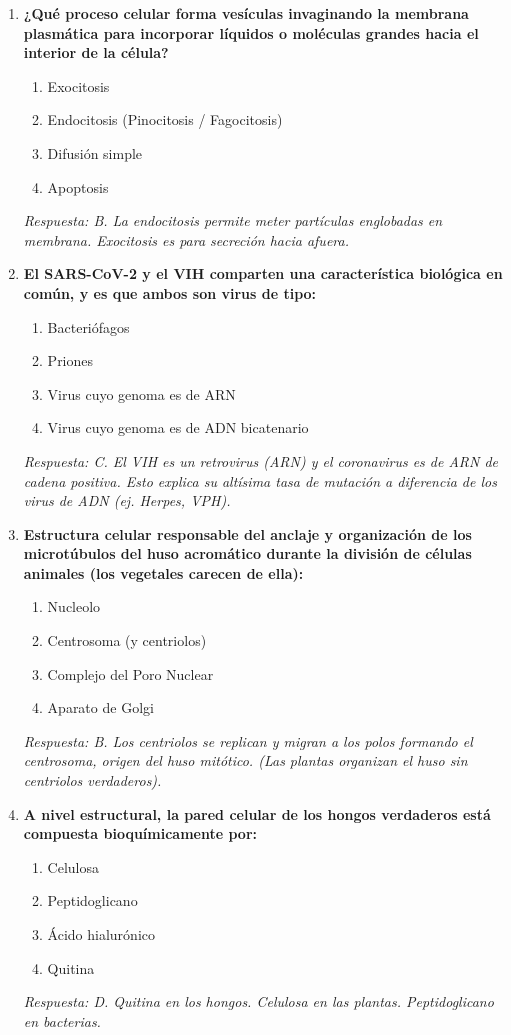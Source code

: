 \documentclass[spanish,letterpaper,oneside]{article}
\begin{document}
\begin{enumerate}[label=\textbf{\arabic*.}]
    \item \textbf{¿Qué proceso celular forma vesículas invaginando la membrana plasmática para incorporar líquidos o moléculas grandes hacia el interior de la célula?}
    \begin{enumerate}
        \item[A)] Exocitosis
        \item[B)] Endocitosis (Pinocitosis / Fagocitosis)
        \item[C)] Difusión simple
        \item[D)] Apoptosis
    \end{enumerate}
    \textit{Respuesta: B. La endocitosis permite meter partículas englobadas en membrana. Exocitosis es para secreción hacia afuera.}

    \item \textbf{El SARS-CoV-2 y el VIH comparten una característica biológica en común, y es que ambos son virus de tipo:}
    \begin{enumerate}
        \item[A)] Bacteriófagos
        \item[B)] Priones
        \item[C)] Virus cuyo genoma es de ARN
        \item[D)] Virus cuyo genoma es de ADN bicatenario
    \end{enumerate}
    \textit{Respuesta: C. El VIH es un retrovirus (ARN) y el coronavirus es de ARN de cadena positiva. Esto explica su altísima tasa de mutación a diferencia de los virus de ADN (ej. Herpes, VPH).}

    \item \textbf{Estructura celular responsable del anclaje y organización de los microtúbulos del huso acromático durante la división de células animales (los vegetales carecen de ella):}
    \begin{enumerate}
        \item[A)] Nucleolo
        \item[B)] Centrosoma (y centriolos)
        \item[C)] Complejo del Poro Nuclear
        \item[D)] Aparato de Golgi
    \end{enumerate}
    \textit{Respuesta: B. Los centriolos se replican y migran a los polos formando el centrosoma, origen del huso mitótico. (Las plantas organizan el huso sin centriolos verdaderos).}

    \item \textbf{A nivel estructural, la pared celular de los hongos verdaderos está compuesta bioquímicamente por:}
    \begin{enumerate}
        \item[A)] Celulosa
        \item[B)] Peptidoglicano
        \item[C)] Ácido hialurónico
        \item[D)] Quitina
    \end{enumerate}
    \textit{Respuesta: D. Quitina en los hongos. Celulosa en las plantas. Peptidoglicano en bacterias.}


\end{enumerate}
\end{document}
